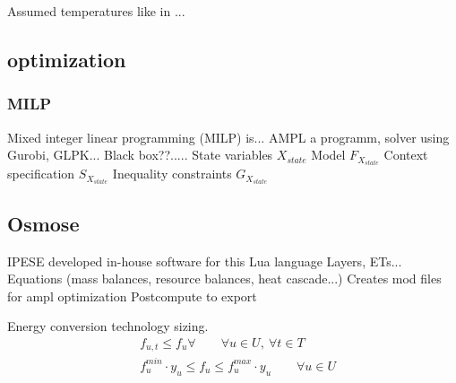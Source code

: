 \documentclass{article}
\begin{document}
Assumed temperatures like in ...


\subsection{optimization}

\subsubsection{MILP}
Mixed integer linear programming (MILP) is... 
AMPL a programm, solver using Gurobi, GLPK...
Black box??.....
State variables $X_{state}$
Model $F_{X_{state}}$
Context specification $S_{X_{state}}$
Inequality constraints $G_{X_{state}}$


%
%


\subsection{Osmose}
IPESE developed in-house software for this
Lua language
Layers, ETs...
Equations (mass balances, resource balances, heat cascade...)
Creates mod files for ampl optimization
Postcompute to export


Energy conversion technology sizing.
\begin{align}
& f_{u,t} \leq f_{u} \forall \qquad \forall u \in U, \ \forall t \in T  \\
& f_{u}^{min} \cdot y_{u} \leq f_{u} \leq f_{u}^{max} \cdot y_{u} \qquad \forall u \in U\\
\end{align}
\end{document}

